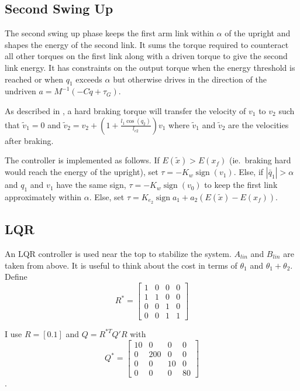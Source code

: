 \documentclass[conference]{IEEEtran}
\DeclareMathOperator\sign{sign}
\begin{document}
\subsection{Second Swing Up}
The second swing up phase keeps the first arm link within $\alpha$ of the upright and shapes the energy of the second link. It sums the torque required to counteract all other torques on the first link along with a driven torque to give the second link energy. It has constraints on the output torque when the energy threshold is reached or when $q_1$ exceeds $\alpha$ but otherwise drives in the direction of the undriven $a=M^{-1}(-C\dot q+\tau_G)$.

As described in \cite{albahkali}, a hard braking torque will transfer the velocity of $v_1$ to $v_2$ such that $\tilde v_1=0$ and $\tilde v_2=v_2 + (1+\frac{l_1\cos(q_2)}{l_{c2}})v_1$ where $\tilde v_1$ and $\tilde v_2$ are the velocities after braking.

The controller is implemented as follows. If $E(\tilde x)>E(x_f)$ (ie.\ braking hard would reach the energy of the upright), set $\tau = -K_w\sign(v_1)$. Else, if $|\bar q_1| > \alpha$ and $q_1$ and $v_1$ have the same sign, $\tau=-K_w\sign(v_0)$ to keep the first link approximately within $\alpha$. Else, set $\tau=K_{e_2}\sign{a_1+a_2}(E(\tilde x)-E(x_f))$.

\subsection{LQR}
An LQR controller is used near the top to stabilize the system. $A_{lin}$ and $B_{lin}$ are taken from above. It is useful to think about the cost in terms of $\theta_1$ and $\theta_1+\theta_2$. Define
\begin{equation*}
	R^{*} = \begin{bmatrix}
		1 & 0 & 0 & 0 \\
		1 & 1 & 0 & 0 \\
		0 & 0 & 1 & 0 \\
		0 & 0 & 1 & 1
	\end{bmatrix}
\end{equation*}

I use $R=[0.1]$ and $Q = R^{*T}Q'R$ with
\begin{equation*}
	Q^{*} = \begin{bmatrix}
		10 & 0 & 0 & 0 \\
		0 & 200 & 0 & 0 \\
		0 & 0 & 10 & 0 \\
		0 & 0 & 0 & 80
	\end{bmatrix}
\end{equation*}
.
\end{document}
